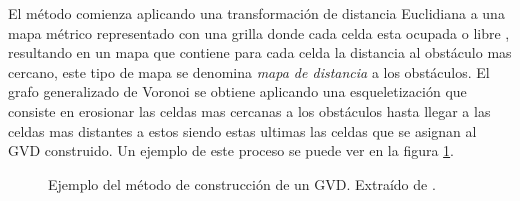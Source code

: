 El método comienza aplicando una transformación de distancia Euclidiana \cite{meijster2002general} a una mapa métrico representado con una grilla donde cada celda esta ocupada o libre , resultando en un mapa que contiene para cada celda la distancia al obstáculo mas cercano, este tipo de mapa se denomina \emph{mapa de distancia} a los obstáculos. El grafo generalizado de Voronoi se obtiene aplicando una esqueletización \cite{zhang1984fast} que consiste en erosionar las celdas mas cercanas a los obstáculos hasta llegar a las celdas mas distantes a estos siendo estas ultimas las celdas que se asignan al GVD construido. Un ejemplo de este proceso se puede ver en la figura \ref{fig:wurmGVD}.
\begin{figure}[H]
  \centering
  \qquad
  \qquad
  \caption{Ejemplo del método de construcción de un GVD. Extraído de \cite{wurm2008coordinated}.}\label{fig:wurmGVD}
\end{figure}

